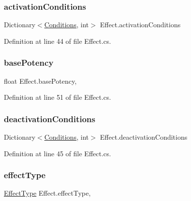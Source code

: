 \subsubsection{\texorpdfstring{activationConditions}{activationConditions}}
{\footnotesize\ttfamily Dictionary$<$\mbox{\hyperlink{class_effect_ab13a718053e330a11f9f66a9b16f4686}{Conditions}}, int$>$ Effect.\+activation\+Conditions\hspace{0.3cm}{\ttfamily [get]}}



Definition at line 44 of file Effect.\+cs.

\mbox{\label{class_effect_a8a406c60ab681a1b0a68365042b32a44}} 
\subsubsection{\texorpdfstring{basePotency}{basePotency}}
{\footnotesize\ttfamily float Effect.\+base\+Potency\hspace{0.3cm}{\ttfamily [get]}, {\ttfamily [set]}}



Definition at line 51 of file Effect.\+cs.

\mbox{\label{class_effect_a364788c565859970111c834c3da7f15d}} 
\subsubsection{\texorpdfstring{deactivationConditions}{deactivationConditions}}
{\footnotesize\ttfamily Dictionary$<$\mbox{\hyperlink{class_effect_ab13a718053e330a11f9f66a9b16f4686}{Conditions}}, int$>$ Effect.\+deactivation\+Conditions\hspace{0.3cm}{\ttfamily [get]}}



Definition at line 45 of file Effect.\+cs.

\mbox{\label{class_effect_a5cf8eca9899b1ce70a9cdad8ab6f5f1e}} 
\subsubsection{\texorpdfstring{effectType}{effectType}}
{\footnotesize\ttfamily \mbox{\hyperlink{class_effect_a28d85888db94ec53ee9cb75e9706f6e4}{Effect\+Type}} Effect.\+effect\+Type\hspace{0.3cm}{\ttfamily [get]}, {\ttfamily [set]}}



